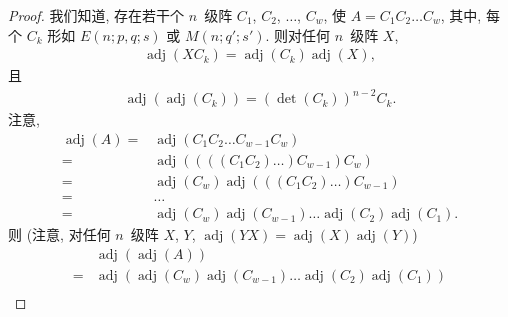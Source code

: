 \documentclass[../libro.tex]{subfiles}
\begin{document}

\begin{proof}
    我们知道,
    存在若干个 \(n\)~级阵
    \(C_1\), \(C_2\), \(\dots\), \(C_w\),
    使 \(A = C_1 C_2 \dots C_w\),
    其中, 每个 \(C_k\) 形如
    \(E(n; p, q; s)\) 或 \(M(n; q'; s')\).
    则对任何 \(n\)~级阵 \(X\),
    \begin{align*}
        \operatorname{adj} {(X C_k)}
        = \operatorname{adj} {(C_k)} \operatorname{adj} {(X)},
    \end{align*}
    且
    \begin{align*}
        \operatorname{adj} {(\operatorname{adj} {(C_k)})}
        = (\det {(C_k)})^{n-2} C_k.
    \end{align*}
    注意,
    \begin{align*}
        \operatorname{adj} {(A)}
        = {} &
        \operatorname{adj} {(C_1 C_2 \dots C_{w-1} C_w)}
        \\
        = {} &
        \operatorname{adj} {((((C_1 C_2) \dots) C_{w-1}) C_w)}
        \\
        = {} &
        \operatorname{adj} {(C_w)}
        \operatorname{adj} {(((C_1 C_2) \dots) C_{w-1})}
        \\
        = {} &
        \dots
        \\
        = {} &
        \operatorname{adj} {(C_w)}
        \operatorname{adj} {(C_{w-1})}
        \dots
        \operatorname{adj} {(C_2)}
        \operatorname{adj} {(C_1)}.
    \end{align*}
    则
    (注意, 对任何 \(n\)~级阵 \(X\), \(Y\), \(
            \operatorname{adj} {(Y X)}
            = \operatorname{adj} {(X)} \operatorname{adj} {(Y)}
    \))
    \begin{align*}
        &
        \operatorname{adj} {(\operatorname{adj} {(A)})}
        \\
        = {} &
        \operatorname{adj}
        {(\operatorname{adj} {(C_w)}
                \operatorname{adj} {(C_{w-1})}
                \dots
                \operatorname{adj} {(C_2)}
        \operatorname{adj} {(C_1)})}
        \\

\end{align*}
\end{proof}
\end{document}
